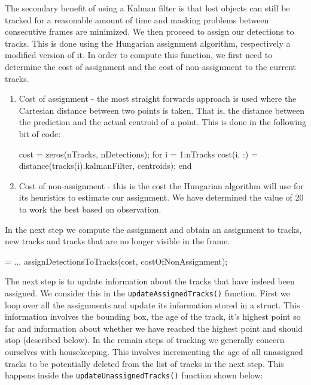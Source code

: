 \documentclass[10pt,a4paper]{article}
\begin{document}
The secondary benefit of using a Kalman filter is that lost objects can still be tracked for a reasonable amount of time and masking problems between consecutive frames are minimized.
	We then proceed to assign our detections to tracks. This is done using the Hungarian assignment algorithm, respectively a modified version of it. In order to compute this function, we first need to determine the cost of assignment and the cost of non-assignment to the current tracks.
	
\begin{enumerate}
\item Cost of assignment - the most straight forwards approach is used where the Cartesian distance between two points is taken. That is, the distance between the prediction and the actual centroid of a point. This is done in the following bit of code:
	\begin{samepage}
	\begin{verbatimtab}
cost = zeros(nTracks, nDetections);
for i = 1:nTracks
	cost(i, :) = distance(tracks(i).kalmanFilter, centroids);
end
	\end{verbatimtab}
	\end{samepage}
\item Cost of non-assignment - this is the cost the Hungarian algorithm will use for its heuristics to estimate our assignment. We have determined the value of 20 to work the best based on observation.
\end{enumerate}

In the next step we compute the assignment and obtain an assignment to tracks, new tracks and tracks that are no longer visible in the frame.

\begin{samepage}
\begin{verbatimtab}
 = ...
	assignDetectionsToTracks(cost, costOfNonAssignment);
\end{verbatimtab}
\end{samepage}

The next step is to update information about the tracks that have indeed been assigned. We consider this in the \texttt{updateAssignedTracks()} function. First we loop over all the assignments and update its information stored in a struct. This information involves the bounding box, the age of the track, it's highest point so far and information about whether we have reached the highest point and should stop (described below).
	In the remain steps of tracking we generally concern ourselves with housekeeping. This involves incrementing the age of all unassigned tracks to be potentially deleted from the list of tracks in the next step. This happens inside the \texttt{updateUnassignedTracks()} function shown below:
\end{document}
